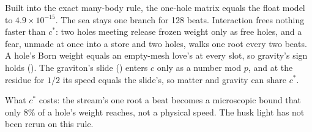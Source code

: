 Built into the exact many-body rule, the one-hole matrix equals the float model to $4.9 \times 10^{-15}$. The sea stays
one branch for 128 beats. Interaction frees nothing faster than $c^*$: two holes meeting release frozen weight only as
free holes, and a fear, unmade at once into a store and two holes, walks one root every two beats. A hole's Born weight
equals an empty-mesh love's at every slot, so gravity's sign holds (). The graviton's slide
() enters $c$ only as a number mod $p$, and at the residue for $1/2$ its speed equals the slide's, so
matter and gravity can share $c^*$.

What $c^*$ costs: the stream's one root a beat becomes a microscopic bound that only 8\% of a hole's weight reaches,
not a physical speed. The husk light has not been rerun on this rule.
